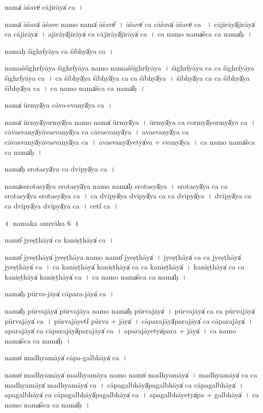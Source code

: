 \documentclass[parskip, DIV=14]{scrartcl}
\begin{document}
{nama̍ ā॒śave̍ cāji॒rāya̍ ca॒~।  

nama̍ ā॒śava̍ ā॒śave॒ namo॒ nama̍ ā॒śave̎~।
ā॒śave̍ ca cā॒śava̍ ā॒śave̍ ca ~।
cā॒ji॒rāyā̍ji॒rāya̍ ca cāji॒rāya̍~।
a॒ji॒rāyā̍ji॒rāya̍ ca cāji॒rāyā̍ji॒rāya̍ ca~।
ca॒ namo॒ nama̍śca ca॒ nama̍ḥ~।

nama॒ḥ śīghri̍yāya ca॒ śībhyā̍ya ca~। 

nama॒śśīghri̍yāya॒ śīghri̍yāya॒  namo॒ nama॒śśīghri̍yāya~।
śīghri̍yāya ca ca॒  śīghri̍yāya॒ śīghri̍yāya ca~।
ca॒ śībhyā̍ya॒ śībhyā̍ya ca ca॒ śībhyā̍ya~।
śībhyā̍ya ca ca॒ śībhyā̍ya॒ śībhyā̍ya ca~।
ca॒ namo॒ nama̍śca ca॒ nama̍ḥ~।

nama̍ ū॒rmyā̍ya cāva-sva॒nyā̍ya ca॒~।

nama̍ ū॒rmyā̍yo॒rmyā̍ya॒ namo॒ nama̍ ū॒rmyā̍ya~।
ū॒rmyā̍ya ca co॒rmyā̍yo॒rmyā̍ya ca~।
cā॒va॒sva॒nyā̍yāvasva॒nyā̍ya ca cāvasva॒nyā̍ya~।
a॒va॒sva॒nyā̍ya ca cāvasva॒nyā̍yāvasva॒nyā̍ya ca~।
a॒va॒sva॒nyā̍yetya̍va + sva॒nyā̍ya~।
ca॒ namo॒ nama̍śca ca॒ nama̍ḥ~।

nama̍ḥ srota॒syā̍ya ca॒ dvīpyā̍ya ca~।

nama̍ssrota॒syā̍ya srota॒syā̍ya॒ namo॒ nama̍ḥ srota॒syā̍ya~।
sro॒ta॒syā̍ya ca ca srota॒syā̍ya srota॒syā̍ya ca~।
ca॒ dvīpyā̍ya॒ dvīpyā̍ya ca ca॒ dvīpyā̍ya~।
dvīpyā̍ya ca ca॒ dvīpyā̍ya॒ dvīpyā̍ya ca~।
ceti̍ ca~।

\newpage
\LARGE
॥~namaka anuvāka 6~॥ 
\Large

namo̎ jye॒ṣṭhāya̍ ca kani॒ṣṭhāya̍ ca॒~।

namo̎ jye॒ṣṭhāya̍ jye॒ṣṭhāya॒  namo॒ namo̎ jye॒ṣṭhāya̍~।
jye॒ṣṭhāya̍ ca ca jye॒ṣṭhāya̍ jye॒ṣṭhāya̍ ca~।
ca॒ ka॒ni॒ṣṭhāya̍ kani॒ṣṭhāya̍ ca ca kani॒ṣṭhāya̍~।
ka॒ni॒ṣṭhāya̍ ca॒ ca kani॒ṣṭhāya̍ kani॒ṣṭhāya̍ ca~।
ca॒ namo॒ nama̍śca ca॒ nama̍ḥ~।

nama̍ḥ pūrva॒-jāya̍ cāpara॒-jāya̍ ca॒~।

nama̍ḥ pūrva॒jāya̍ pūrva॒jāya॒ namo॒ nama̍ḥ pūrva॒jāya̍~।
pū॒rva॒jāya̍ ca ca pūrva॒jāya̍ pūrva॒jāya̍ ca~।
pū॒rva॒jāyeti̍ pūrva + jāya̍~।
cā॒pa॒ra॒jāyā̍para॒jāya̍ ca cāpara॒jāya̍~।
a॒pa॒ra॒jāya̍ ca cāpara॒jāyā̍para॒jāya̍ ca~।
a॒pa॒ra॒jāyetya̍para + jāya̍~।
ca॒ namo॒ nama̍śca ca॒ nama̍ḥ~।

namo̍ madhya॒māya̍ cāpa-ga॒lbhāya̍ ca॒~।

namo̍ madhya॒māya̍ madhya॒māya॒ namo॒ namo̍ madhya॒māya̍~।
ma॒dhya॒māya̍ ca ca madhya॒māya̍ madhya॒māya̍ ca~।
cā॒pa॒ga॒lbhāyā̍paga॒lbhāya̍ ca cāpaga॒lbhāya̍~।
a॒pa॒ga॒lbhāya̍ ca cāpaga॒lbhāyā̍paga॒lbhāya̍ ca~।
a॒pa॒ga॒lbhāyetya̍pa + ga॒lbhāya̍~।
ca॒ namo॒ nama̍śca ca॒ nama̍ḥ~।

}
\end{document}

